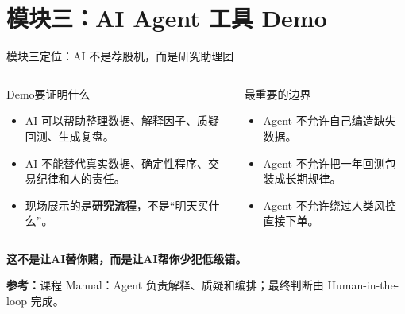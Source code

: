 \documentclass[UTF8,aspectratio=169,11pt]{ctexbeamer}
\newcommand{\source}[1]{\vfill{\scriptsize\color{aqgray}\textbf{参考：}#1}}
\begin{document}
\section{模块三：AI Agent 工具 Demo}

\begin{frame}{模块三定位：AI 不是荐股机，而是研究助理团}
\begin{columns}[T,totalwidth=\textwidth]
\begin{greenbox}{Demo要证明什么}
\small
\begin{itemize}
\item AI 可以帮助整理数据、解释因子、质疑回测、生成复盘。
\item AI 不能替代真实数据、确定性程序、交易纪律和人的责任。
\item 现场展示的是\textbf{研究流程}，不是“明天买什么”。
\end{itemize}
\end{greenbox}
\begin{riskbox}{最重要的边界}
\small
\begin{itemize}
\item Agent 不允许自己编造缺失数据。
\item Agent 不允许把一年回测包装成长期规律。
\item Agent 不允许绕过人类风控直接下单。
\end{itemize}
\end{riskbox}
\end{columns}
\vspace{0.25cm}
\begin{center}\Large \textbf{这不是让AI替你赌，而是让AI帮你少犯低级错。}\end{center}
\source{课程 Manual：Agent 负责解释、质疑和编排；最终判断由 Human-in-the-loop 完成。}
\end{frame}
\end{document}
